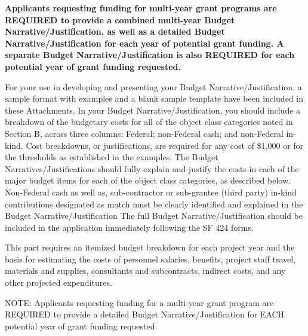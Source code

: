 \textbf{Applicants requesting funding for multi-year grant programs are REQUIRED to provide a combined multi-year Budget Narrative/Justification, as well as a detailed Budget Narrative/Justification for each year of potential grant funding. A separate Budget Narrative/Justification is also REQUIRED for each potential year of grant funding requested.}

For your use in developing and presenting your Budget Narrative/Justification, a sample format with examples and a blank sample template have been included in these Attachments. In your Budget Narrative/Justification, you should include a breakdown of the budgetary costs for all of the object class categories noted in Section B, across three columns: Federal; non-Federal cash; and non-Federal in-kind. Cost breakdowns, or justifications, are required for any cost of \$1,000 or for the thresholds as established in the examples. The Budget Narratives/Justifications should fully explain and justify the costs in each of the major budget items for each of the object class categories, as described below. Non-Federal cash as well as, sub-contractor or sub-grantee (third party) in-kind contributions designated as match must be clearly identified and explained in the Budget Narrative/Justification The full Budget Narrative/Justification should be included in the application immediately following the SF 424 forms.

This part requires an itemized budget breakdown for each project year and the basis for estimating the costs of personnel salaries, benefits, project staff travel, materials and supplies, consultants and subcontracts, indirect costs, and any other projected expenditures.

NOTE: Applicants requesting funding for a multi-year grant program are REQUIRED to provide a detailed Budget Narrative/Justification for EACH potential year of grant funding requested.

